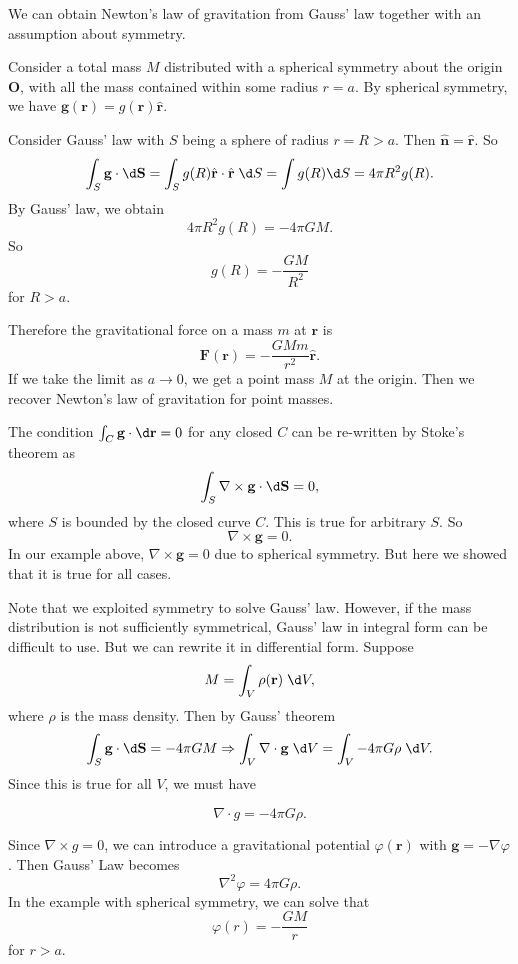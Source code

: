 \documentclass[a4paper]{article}
\begin{document}
\begin{eg}
  We can obtain Newton's law of gravitation from Gauss' law  together with an assumption about symmetry.

  Consider a total mass $M$ distributed with a spherical symmetry about the origin $\mathbf{O}$, with all the mass contained within some radius $r = a$. By spherical symmetry, we have $\mathbf{g}(\mathbf{r}) = g(\mathbf{r})\hat{\mathbf{r}}$.

  Consider Gauss' law with $S$ being a sphere of radius $r = R > a$. Then $\hat{\mathbf{n}} = \hat{\mathbf{r}}$. So
  \[
    \int_S \mathbf{g}\cdot \d \mathbf{S} = \int_S g(R)\hat{\mathbf{r}}\cdot \hat{\mathbf{r}}\;\d S = \int g(R)\d S = 4\pi R^2 g(R).
  \]
  By Gauss' law, we obtain
  \[
    4\pi R^2 g(R) = -4\pi GM.
  \]
  So
  \[
    g(R) = -\frac{GM}{R^2}
  \]
  for $R > a$.

  Therefore the gravitational force on a mass $m$ at $\mathbf{r}$ is
  \[
    \mathbf{F}(\mathbf{r}) = -\frac{GMm}{r^2}\hat{\mathbf{r}}.
  \]
  If we take the limit as $a\to 0$, we get a point mass $M$ at the origin. Then we recover Newton's law of gravitation for point masses.
\end{eg}

The condition $\int_C \mathbf{g}\cdot \d \mathbf{r} = 0$ for any closed $C$ can be re-written by Stoke's theorem as
\[
  \int_S \nabla\times \mathbf{g}\cdot \d \mathbf{S} = 0,
\]
where $S$ is bounded by the closed curve $C$. This is true for arbitrary $S$. So
\[
  \nabla\times \mathbf{g} = 0.
\]
In our example above, $\nabla\times \mathbf{g} = 0$ due to spherical symmetry. But here we showed that it is true for all cases.

Note that we exploited symmetry to solve Gauss' law. However, if the mass distribution is not sufficiently symmetrical, Gauss' law in integral form can be difficult to use. But we can rewrite it in differential form. Suppose
\[
  M = \int_V \rho(\mathbf{r})\;\d V,
\]
where $\rho$ is the mass density. Then by Gauss' theorem
\[
  \int_S \mathbf{g} \cdot \d \mathbf{S} = -4\pi GM \Rightarrow  \int_V \nabla\cdot \mathbf{g}\;\d V = \int_V -4\pi G\rho \;\d V.
\]
Since this is true for all $V$, we must have
\begin{law}
  \[
    \nabla\cdot g = -4\pi G\rho.
  \]
\end{law}
Since $\nabla\times g = 0$, we can introduce a gravitational potential $\varphi(\mathbf{r})$ with $\mathbf{g} = -\nabla \varphi$. Then Gauss' Law becomes
\[
  \nabla^2 \varphi = 4\pi G\rho.
\]
In the example with spherical symmetry, we can solve that
\[
  \varphi(r) = -\frac{GM}{r}
\]
for $r > a$.
\end{document}

